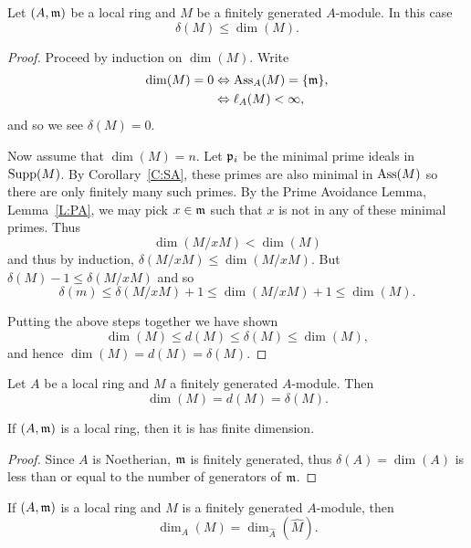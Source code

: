 \documentclass{ximera}
\begin{document}
\begin{lemma}
  Let $(A,\mathfrak{m})$ be a local ring and $M$ be a finitely generated
  $A$-module. In this case
  \[
  \delta(M)\le \dim(M).
  \]
  \begin{proof}
    Proceed by induction on $\dim(M)$. Write
    \begin{align*}
      \dim(M) = 0 &\Leftrightarrow \operatorname{Ass}_A(M)=\{\mathfrak{m}\}, \\
      &\Leftrightarrow \ell_A(M) <\infty,
    \end{align*}
    and so we see $\delta(M) = 0$.
    
    Now assume that $\dim(M)=n$. Let $\mathfrak{p}_i$ be the minimal prime
    ideals in $\operatorname{Supp}(M)$. By Corollary~\ref{C:SA}, these primes are
    also minimal in $\operatorname{Ass}(M)$ so there are only finitely many such
    primes. By the Prime Avoidance Lemma,
    Lemma~\ref{L:PA}, we may pick $x\in\mathfrak{m}$ such that $x$ is not in any
    of these minimal primes. Thus
    \[
    \dim(M/xM) <\dim(M)
    \]
    and thus by induction, $\delta(M/xM)\le\dim(M/xM)$. But $\delta(M)-1\le \delta(M/xM)$ and so
    \[
    \delta(m) \le \delta(M/xM) +1 \le \dim(M/xM) +1 \le \dim(M).
    \]

    Putting the above steps together we have shown 
    \[
    \dim(M)\le d(M) \le \delta(M) \le \dim(M),
    \]
    and hence $\dim(M) = d(M) = \delta(M)$.  
  \end{proof}
\end{lemma}



\begin{theorem}\label{T:dimension}
  Let $A$ be a local ring and $M$ a finitely generated
  $A$-module. Then
  \[
  \dim(M) = d(M) = \delta(M).
  \]
\end{theorem}



\begin{corollary} If $(A,\mathfrak{m})$ is a local ring, then it is has finite dimension.
\end{corollary}

\begin{proof} Since $A$ is Noetherian, $\mathfrak{m}$ is finitely generated, thus $\delta(A)=\dim(A)$ is less than or equal to the number of generators of $\mathfrak{m}$.
\end{proof}


\begin{corollary} If $(A,\mathfrak{m})$ is a local ring and $M$ is a finitely generated $A$-module, then 
\[
\dim_A(M) =\dim_{\hat{A}}(\hat{M}).
\]
\end{corollary}
\end{document}
